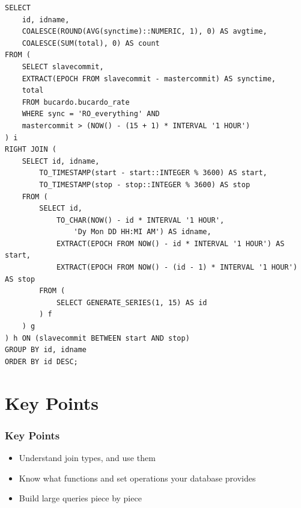 \documentclass{beamer}
\begin{document}
\begin{frame}[fragile]
    \tiny
    \begin{verbatim}
SELECT
    id, idname,
    COALESCE(ROUND(AVG(synctime)::NUMERIC, 1), 0) AS avgtime,
    COALESCE(SUM(total), 0) AS count
FROM (
    SELECT slavecommit,
    EXTRACT(EPOCH FROM slavecommit - mastercommit) AS synctime,
    total
    FROM bucardo.bucardo_rate
    WHERE sync = 'RO_everything' AND
    mastercommit > (NOW() - (15 + 1) * INTERVAL '1 HOUR')
) i
RIGHT JOIN (
    SELECT id, idname,
        TO_TIMESTAMP(start - start::INTEGER % 3600) AS start,
        TO_TIMESTAMP(stop - stop::INTEGER % 3600) AS stop
    FROM (
        SELECT id,
            TO_CHAR(NOW() - id * INTERVAL '1 HOUR', 
                'Dy Mon DD HH:MI AM') AS idname,
            EXTRACT(EPOCH FROM NOW() - id * INTERVAL '1 HOUR') AS start,
            EXTRACT(EPOCH FROM NOW() - (id - 1) * INTERVAL '1 HOUR') AS stop
        FROM (
            SELECT GENERATE_SERIES(1, 15) AS id
        ) f
    ) g
) h ON (slavecommit BETWEEN start AND stop)
GROUP BY id, idname
ORDER BY id DESC;
    \end{verbatim}
\end{frame}

\section{Key Points}
\begin{frame}
    \frametitle{Key Points}
    \begin{itemize}
        \item Understand join types, and use them
        \pause
        \item Know what functions and set operations your database provides
        \pause
        \item Build large queries piece by piece
    \end{itemize}
\end{frame}

\end{document}
